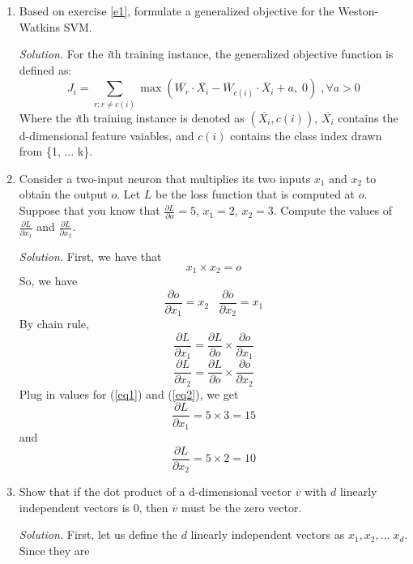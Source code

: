 \documentclass[12pt]{article}
\newcommand\sol[1] {
    \begin{mdframed}
        \emph{Solution.} #1
    \end{mdframed}
}
\begin{document}
\begin{enumerate}[ref=\theenumi]
    \item Based on exercise \ref{e1}, formulate a generalized objective for the 
        Weston-Watkins SVM.
        \sol {
            For the \emph{i}th training instance, the generalized objective
            function is defined as:
            \[
                J_i = \sum_{r:r \neq c(i)} \max{(\overline{W_r} \cdot \overline{X_i}
                -\overline{W}_{c(i)} \cdot \overline{X}_i + a, \;0)} \;, \forall a > 0
            \]
            Where the \emph{i}th training instance is denoted as $(\overline{X_i}, c(i))$,
            $\overline{X_i}$ contains the d-dimensional feature vaiables, and $c(i)$
            contains the class index drawn from \{1, ... k\}.
        }
    \item Consider a two-input neuron that multiplies its two inputs $x_1$ and 
        $x_2$ to obtain the output $o$. Let $L$ be the loss function that is 
        computed at $o$. Suppose that you know that 
        $\frac{\partial L}{\partial o} = 5$, $x_1 = 2$, $x_2 = 3$. Compute the 
        values of $\frac{\partial L}{\partial x_1}$ and 
        $\frac{\partial L}{\partial x_2}$.
        \sol{
            First, we have that
            \[
                x_1 \times x_2 = o
            \]
            So, we have
            \[
                \frac{\partial o}{\partial x_1} = x_2 \;\;\;  \frac{\partial o}{\partial x_2} = x_1 
            \]
            By chain rule, 
            \begin{equation}\label{eq1}
                \frac{\partial L}{\partial x_1} = \frac{\partial L}{\partial o} \times \frac{\partial o}{\partial x_1}
            \end{equation}
            \begin{equation}\label{eq2}
                \frac{\partial L}{\partial x_2} = \frac{\partial L}{\partial o} \times \frac{\partial o}{\partial x_2}
            \end{equation}
            Plug in values for (\ref{eq1}) and (\ref{eq2}), we get
            \[
                \frac{\partial L}{\partial x_1} = 5 \times 3 = 15
            \]
            and
            \[
                \frac{\partial L}{\partial x_2} = 5 \times 2 = 10
            \]
        }
    \item Show that if the dot product of a d-dimensional vector $\overline{v}$ 
        with $d$ linearly independent vectors is 0, then $\overline{v}$ 
        must be the zero vector.
        \sol{
            First, let us define the $d$ linearly independent vectors as 
            $x_1, x_2, ... \; x_d$.  Since they are 
}
\end{enumerate}
\end{document}
